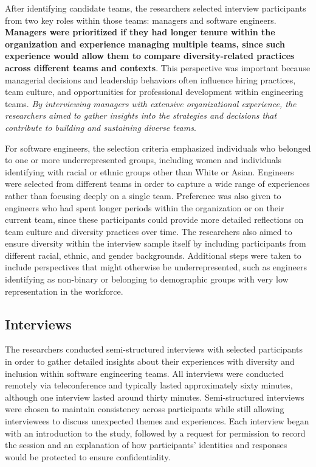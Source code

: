 After identifying candidate teams, the researchers selected interview participants from two key roles within those teams: managers and software engineers. \textbf{Managers were prioritized if they had longer tenure within the organization and experience managing multiple teams, since such experience would allow them to compare diversity-related practices across different teams and contexts}. This perspective was important because managerial decisions and leadership behaviors often influence hiring practices, team culture, and opportunities for professional development within engineering teams. \textit{By interviewing managers with extensive organizational experience, the researchers aimed to gather insights into the strategies and decisions that contribute to building and sustaining diverse teams}.

For software engineers, the selection criteria emphasized individuals who belonged to one or more underrepresented groups, including women and individuals identifying with racial or ethnic groups other than White or Asian. Engineers were selected from different teams in order to capture a wide range of experiences rather than focusing deeply on a single team. Preference was also given to engineers who had spent longer periods within the organization or on their current team, since these participants could provide more detailed reflections on team culture and diversity practices over time. The researchers also aimed to ensure diversity within the interview sample itself by including participants from different racial, ethnic, and gender backgrounds. Additional steps were taken to include perspectives that might otherwise be underrepresented, such as engineers identifying as non-binary or belonging to demographic groups with very low representation in the workforce.

\subsection{Interviews}

The researchers conducted semi-structured interviews with selected participants in order to gather detailed insights about their experiences with diversity and inclusion within software engineering teams. All interviews were conducted remotely via teleconference and typically lasted approximately sixty minutes, although one interview lasted around thirty minutes. Semi-structured interviews were chosen to maintain consistency across participants while still allowing interviewees to discuss unexpected themes and experiences. Each interview began with an introduction to the study, followed by a request for permission to record the session and an explanation of how participants’ identities and responses would be protected to ensure confidentiality.

